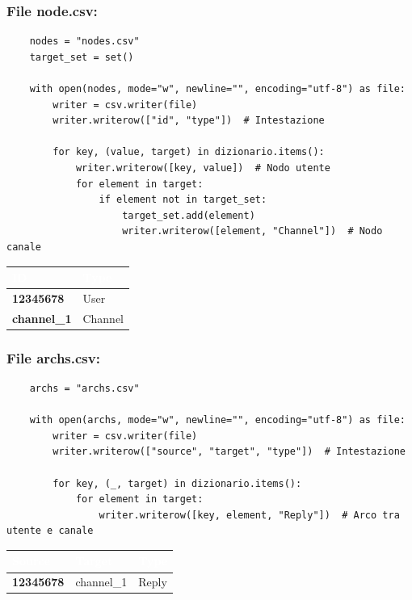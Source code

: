 \documentclass[12pt]{article}
\begin{document}
	\subsubsection{File node.csv:}
	\begin{lstlisting}
	nodes = "nodes.csv"
	target_set = set()
		
	with open(nodes, mode="w", newline="", encoding="utf-8") as file:
		writer = csv.writer(file)
		writer.writerow(["id", "type"])  # Intestazione
		
		for key, (value, target) in dizionario.items():
			writer.writerow([key, value])  # Nodo utente
			for element in target:
				if element not in target_set:
					target_set.add(element)
					writer.writerow([element, "Channel"])  # Nodo canale
	\end{lstlisting}
	\begin{table}[h!]
		\centering
		\renewcommand{\arraystretch}{1.5}
		\setlength{\tabcolsep}{12pt}
		\begin{tabular}{|p{6cm}|p{8cm}|}
			\hline
			\cellcolor{darkblue}\textcolor{white}{\textbf{ID}} & \cellcolor{darkblue}\textcolor{white}{\textbf{Type}} \\
			\hline
			\textbf{12345678} & User \\
			\hline
			\textbf{channel\_1} & Channel\\
			\hline
		\end{tabular}
	\end{table}
	\newpage
	\subsubsection{File archs.csv:}
	\begin{lstlisting}
	archs = "archs.csv"
		
	with open(archs, mode="w", newline="", encoding="utf-8") as file:
		writer = csv.writer(file)
		writer.writerow(["source", "target", "type"])  # Intestazione
		
		for key, (_, target) in dizionario.items():
			for element in target:
				writer.writerow([key, element, "Reply"])  # Arco tra utente e canale
	\end{lstlisting}
	\begin{table}[h!]
		\centering
		\renewcommand{\arraystretch}{1.5}
		\setlength{\tabcolsep}{12pt}
		\begin{tabular}{|p{5cm}|p{4cm}|p{4cm}|}
			\hline
			\cellcolor{darkblue}\textcolor{white}{\textbf{Source}} & 
			\cellcolor{darkblue}\textcolor{white}{\textbf{Target}} & 
			\cellcolor{darkblue}\textcolor{white}{\textbf{Type}} \\
			\hline
			\textbf{12345678} & channel\_1 & Reply \\
			\hline
		\end{tabular}
	\end{table}
\end{document}
